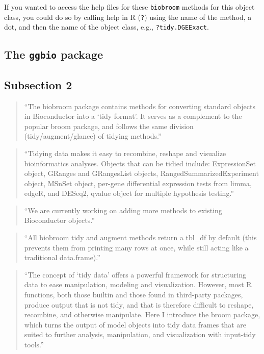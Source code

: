 \documentclass[]{tufte-book}
\begin{document}
If you wanted to access the help files for these \texttt{biobroom} methods for this
object class, you could do so by calling help in R (\texttt{?}) using the name of the
method, a dot, and then the name of the object class, e.g., \texttt{?tidy.DGEExact}.

\hypertarget{the-ggbio-package}{%
\subsection{\texorpdfstring{The \texttt{ggbio} package}{The ggbio package}}\label{the-ggbio-package}}

\hypertarget{subsection-2-4}{%
\subsection{Subsection 2}\label{subsection-2-4}}

\begin{quote}
``The biobroom package contains methods for converting standard objects in Bioconductor into a `tidy format'. It serves as a complement to the popular broom package, and follows the same division (tidy/augment/glance) of tidying methods.''
\citep{biobroom}
\end{quote}

\begin{quote}
``Tidying data makes it easy to recombine, reshape and visualize bioinformatics analyses. Objects that can be tidied include: ExpressionSet object,
GRanges and GRangesList objects, RangedSummarizedExperiment object, MSnSet object,
per-gene differential expression tests from limma, edgeR, and DESeq2, qvalue object for multiple hypothesis testing.'' \citep{biobroom}
\end{quote}

\begin{quote}
``We are currently working on adding more methods to existing Bioconductor objects.'' \citep{biobroom}
\end{quote}

\begin{quote}
``All biobroom tidy and augment methods return a tbl\_df by default (this prevents them from printing many rows at once, while still acting like a traditional data.frame).'' \citep{biobroom}
\end{quote}

\begin{quote}
``The concept of `tidy data' offers a powerful framework for structuring data
to ease manipulation, modeling and visualization. However, most R functions,
both those builtin and those found in third-party packages, produce output that
is not tidy, and that is therefore difficult to reshape, recombine, and
otherwise manipulate. Here I introduce the broom package, which turns the output
of model objects into tidy data frames that are suited to further analysis,
manipulation, and visualization with input-tidy tools.'' \citep{robinson2014broom}
\end{quote}
\end{document}
